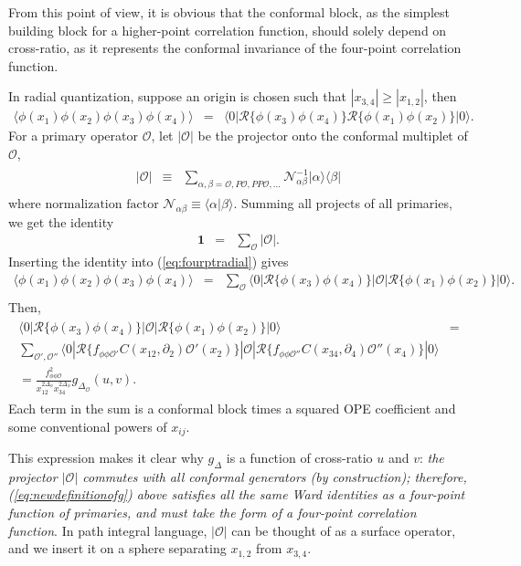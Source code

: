 \documentclass[12pt]{article}
\numberwithin{equation}{section}
\newcommand\be{\begin{eqnarray}}
\newcommand\ee{\end{eqnarray}}
\newcommand\f\phi
\newcommand\cO{\mathcal{O}}
\newcommand\ptl\partial
\newcommand\<\langle
\renewcommand\>\rangle
\newcommand\nn{\nonumber}
\renewcommand\.{\cdot}
\newcommand\De{\Delta}
\renewcommand\b\beta
\renewcommand\a\alpha
\begin{document}
From this point of view, it is obvious that the conformal block, as the simplest building block for a higher-point correlation function, should solely depend on cross-ratio, as it represents the conformal invariance of the four-point correlation function.

In radial quantization, suppose an origin is chosen such that $|x_{3,4}|\geq |x_{1,2}|$, then
\be
\label{eq:fourptradial}
\<\f(x_1)\f(x_2)\f(x_3)\f(x_4)\> &=& \<0|\mathcal{R}\{\f(x_3)\f(x_4)\}\mathcal{R}\{\f(x_1)\f(x_2)\}|0\>.\quad
\ee
For a primary operator $\cO$, let $|\cO|$ be the projector onto the conformal multiplet of $\cO$,
\be
\begin{split}
|\cO| &\equiv& \sum_{\a,\b=\cO,P\cO,PP\cO,\dots} \mathcal{N}^{-1}_{\a\b}|\a\>\<\b|
\end{split}
\ee
where $\text{normalization factor }\mathcal{N}_{\a\b} \equiv \<\a|\b\>.$
Summing all projects of all primaries, we get the identity
\be
\mathbf{1} &=& \sum_\cO |\cO|.
\ee
Inserting the identity into (\ref{eq:fourptradial}) gives
\be
\label{eq:insertingprojector}
\<\f(x_1)\f(x_2)\f(x_3)\f(x_4)\> &=& \sum_\cO\<0|\mathcal{R}\{\f(x_3)\f(x_4)\}|\cO|\mathcal{R}\{\f(x_1)\f(x_2)\}|0\>.\nn\\
\ee
Then,
\be
\label{eq:newdefinitionofg}
\begin{split}
\<0|\mathcal{R}\{\f(x_3)\f(x_4)\}|\cO|\mathcal{R}\{\f(x_1)\f(x_2)\}|0\> &=&
\\
\sum_{\mathcal{O}',\mathcal{O}''}\<0|\mathcal{R}\{f_{\f\f\cO'} C(x_{12},\ptl_2)\cO'(x_2) \}|\mathcal{O}|\mathcal{R}\{f_{\f\f\cO''}C(x_{34},\ptl_4)\cO''(x_4)\}|0\>
\\
=\frac{f_{\f\f\cO}^2}{x_{12}^{2\De_\f}x_{34}^{2\De_\f}}g_{\De_\cO}(u,v).\qquad
\end{split}
\ee
Each term in the sum is a conformal block times a squared OPE coefficient and some conventional powers of $x_{ij}$.



This expression makes it clear why $g_{\De}$ is a function of cross-ratio $u$ and $v$: \textit{the projector $|\cO|$ commutes with all conformal generators (by construction); therefore, (\ref{eq:newdefinitionofg}) above satisfies all the same Ward identities as a four-point function of primaries, and must take the form of a four-point correlation function}. In path integral language, $|\cO|$ can be thought of as a surface operator, and we insert it on a sphere separating $x_{1,2}$ from $x_{3,4}$.
\end{document}
